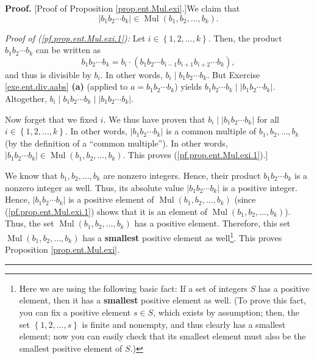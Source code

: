 \documentclass[numbers=enddot,12pt,final,onecolumn,notitlepage]{scrartcl}%
\numberwithin{exer}{subsection}
\theoremstyle{definition}
\newenvironment{proof}[1][Proof]{\noindent\textbf{#1.} }{\ \rule{0.5em}{0.5em}}
\begin{document}
\begin{proof}
[Proof of Proposition \ref{prop.ent.Mul.exi}.]We claim that%
\begin{equation}
\left\vert b_{1}b_{2}\cdots b_{k}\right\vert \in\operatorname*{Mul}\left(
b_{1},b_{2},\ldots,b_{k}\right)  . \label{pf.prop.ent.Mul.exi.1}%
\end{equation}


\textit{Proof of (\ref{pf.prop.ent.Mul.exi.1}):} Let $i\in\left\{
1,2,\ldots,k\right\}  $. Then, the product $b_{1}b_{2}\cdots b_{k}$ can be
written as%
\[
b_{1}b_{2}\cdots b_{k}=b_{i}\cdot\left(  b_{1}b_{2}\cdots b_{i-1}%
b_{i+1}b_{i+2}\cdots b_{k}\right)  ,
\]
and thus is divisible by $b_{i}$. In other words, $b_{i}\mid b_{1}b_{2}\cdots
b_{k}$. But Exercise \ref{exe.ent.div.aabs} \textbf{(a)} (applied to
$a=b_{1}b_{2}\cdots b_{k}$) yields $b_{1}b_{2}\cdots b_{k}\mid\left\vert
b_{1}b_{2}\cdots b_{k}\right\vert $. Altogether, $b_{i}\mid b_{1}b_{2}\cdots
b_{k}\mid\left\vert b_{1}b_{2}\cdots b_{k}\right\vert $.

Now forget that we fixed $i$. We thus have proven that $b_{i}\mid\left\vert
b_{1}b_{2}\cdots b_{k}\right\vert $ for all $i\in\left\{  1,2,\ldots
,k\right\}  $. In other words, $\left\vert b_{1}b_{2}\cdots b_{k}\right\vert $
is a common multiple of $b_{1},b_{2},\ldots,b_{k}$ (by the definition of a
\textquotedblleft common multiple\textquotedblright). In other words,
$\left\vert b_{1}b_{2}\cdots b_{k}\right\vert \in\operatorname*{Mul}\left(
b_{1},b_{2},\ldots,b_{k}\right)  $. This proves (\ref{pf.prop.ent.Mul.exi.1}).]

We know that $b_{1},b_{2},\ldots,b_{k}$ are nonzero integers. Hence, their
product $b_{1}b_{2}\cdots b_{k}$ is a nonzero integer as well. Thus, its
absolute value $\left\vert b_{1}b_{2}\cdots b_{k}\right\vert $ is a positive
integer. Hence, $\left\vert b_{1}b_{2}\cdots b_{k}\right\vert $ is a positive
element of $\operatorname*{Mul}\left(  b_{1},b_{2},\ldots,b_{k}\right)  $
(since (\ref{pf.prop.ent.Mul.exi.1}) shows that it is an element of
$\operatorname*{Mul}\left(  b_{1},b_{2},\ldots,b_{k}\right)  $). Thus, the set
$\operatorname*{Mul}\left(  b_{1},b_{2},\ldots,b_{k}\right)  $ has a positive
element. Therefore, this set $\operatorname*{Mul}\left(  b_{1},b_{2}%
,\ldots,b_{k}\right)  $ has a \textbf{smallest} positive element as
well\footnote{Here we are using the following basic fact: If a set of integers
$S$ has a positive element, then it has a \textbf{smallest} positive element
as well. (To prove this fact, you can fix a positive element $s\in S$, which
exists by assumption; then, the set $\left\{  1,2,\ldots,s\right\}  $ is
finite and nonempty, and thus clearly has a smallest element; now you can
easily check that its smallest element must also be the smallest positive
element of $S$.)}. This proves Proposition \ref{prop.ent.Mul.exi}.
\end{proof}
\end{document}
